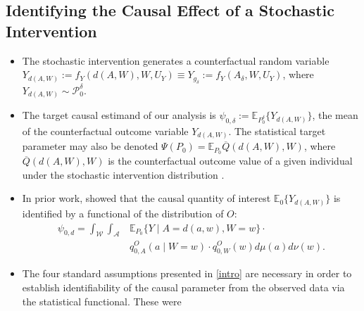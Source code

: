 \documentclass[
  12pt, krantz2,
]{book}
\theoremstyle{definition}
\theoremstyle{definition}
\theoremstyle{definition}
\newcommand{\1}{\mathbbm{1}}
\begin{document}
\hypertarget{identifying-the-causal-effect-of-a-stochastic-intervention}{%
\subsection{Identifying the Causal Effect of a Stochastic Intervention}\label{identifying-the-causal-effect-of-a-stochastic-intervention}}

\begin{itemize}
\item
  The stochastic intervention generates a counterfactual random variable
  \(Y_{d(A,W)} := f_Y(d(A,W), W, U_Y) \equiv Y_{g_{\delta}} := f_Y(A_{\delta}, W, U_Y)\), where \(Y_{d(A,W)} \sim \mathcal{P}_0^{\delta}\).
\item
  The target causal estimand of our analysis is \(\psi_{0, \delta} := \mathbb{E}_{P_0^{\delta}}\{Y_{d(A,W)}\}\), the mean of the counterfactual
  outcome variable \(Y_{d(A, W)}\). The statistical target parameter may also be
  denoted \(\Psi(P_0) = \mathbb{E}_{P_0}{\overline{Q}(d(A, W), W)}\), where
  \(\overline{Q}(d(A, W), W)\) is the counterfactual outcome value of a given
  individual under the stochastic intervention distribution
  \citep{diaz2018stochastic}.
\item
  In prior work, \citet{diaz2012population} showed that the causal quantity of interest
  \(\mathbb{E}_0 \{Y_{d(A, W)}\}\) is identified by a functional of the
  distribution of \(O\):
  \begin{align*}\label{eqn:identification2012}
    \psi_{0,d} = \int_{\mathcal{W}} \int_{\mathcal{A}} & \mathbb{E}_{P_0}
     \{Y \mid A = d(a, w), W = w\} \cdot \\ &q_{0, A}^O(a \mid W = w) \cdot
     q_{0, W}^O(w) d\mu(a)d\nu(w).
  \end{align*}
\item
  The four standard assumptions presented in \ref{intro} are necessary in order
  to establish identifiability of the causal parameter from the observed data
  via the statistical functional. These were


\end{itemize}
\end{document}
